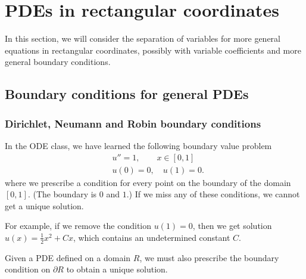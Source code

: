 \section{PDEs in rectangular coordinates}

In this section, we will consider the separation of variables for more general equations in rectangular coordinates, possibly with variable coefficients and more general boundary conditions. 

\subsection{Boundary conditions for general PDEs}


\subsubsection{Dirichlet, Neumann and Robin boundary conditions}

In the ODE class, we have learned the following boundary value problem
\begin{equation}\label{eq.ODE_boundary}
    \begin{split}
        &u'' = 1, \qquad x\in [0, 1]
        \\
        &u(0) = 0,\quad u(1) = 0.
    \end{split}
\end{equation}
where we prescribe a condition for every point on the boundary of the domain $[0, 1]$. (The boundary is $0$ and $1$.) If we miss any of these conditions, we cannot get a unique solution. 

For example, if we remove the condition $u(1) = 0$, then we get solution $u(x) = \frac{1}{2}x^2 + Cx$, which contains an undetermined constant $C$.

Given a PDE defined on a domain $R$, we must also prescribe the boundary condition on $\partial R$ to obtain a unique solution.

